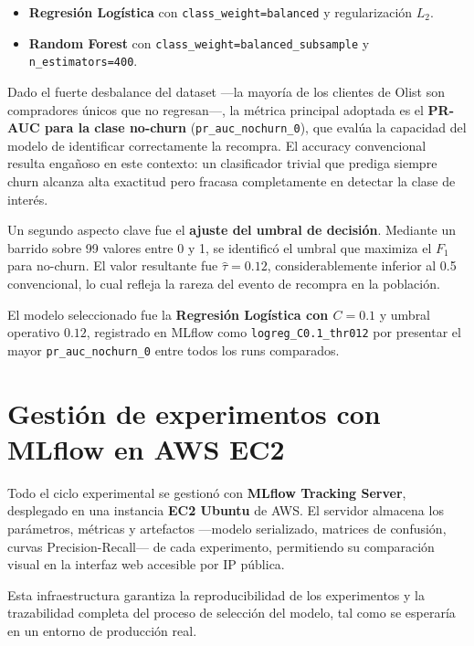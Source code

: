 \documentclass[11pt]{article}
\begin{document}
\begin{itemize}[leftmargin=1.5em]
  \item \textbf{Regresión Logística} con \texttt{class\_weight=balanced} y regularización $L_2$.
  \item \textbf{Random Forest} con \texttt{class\_weight=balanced\_subsample} y
        \texttt{n\_estimators=400}.
\end{itemize}

Dado el fuerte desbalance del dataset —la mayoría de los clientes de Olist son compradores
únicos que no regresan—, la métrica principal adoptada es el
\textbf{PR-AUC para la clase no-churn} (\texttt{pr\_auc\_nochurn\_0}), que evalúa la
capacidad del modelo de identificar correctamente la recompra. El accuracy convencional
resulta engañoso en este contexto: un clasificador trivial que prediga siempre churn alcanza
alta exactitud pero fracasa completamente en detectar la clase de interés.

Un segundo aspecto clave fue el \textbf{ajuste del umbral de decisión}. Mediante un barrido
sobre 99 valores entre 0 y 1, se identificó el umbral que maximiza el $F_1$ para no-churn.
El valor resultante fue $\hat\tau = 0.12$, considerablemente inferior al 0.5 convencional,
lo cual refleja la rareza del evento de recompra en la población.

El modelo seleccionado fue la \textbf{Regresión Logística con $C=0.1$} y umbral operativo
$0.12$, registrado en MLflow como \texttt{logreg\_C0.1\_thr012} por presentar el mayor
\texttt{pr\_auc\_nochurn\_0} entre todos los runs comparados.

\section{Gestión de experimentos con MLflow en AWS EC2}

Todo el ciclo experimental se gestionó con \textbf{MLflow Tracking Server}, desplegado en
una instancia \textbf{EC2 Ubuntu} de AWS. El servidor almacena los parámetros, métricas y
artefactos —modelo serializado, matrices de confusión, curvas Precision-Recall— de cada
experimento, permitiendo su comparación visual en la interfaz web accesible por IP pública.

Esta infraestructura garantiza la reproducibilidad de los experimentos y la trazabilidad
completa del proceso de selección del modelo, tal como se esperaría en un entorno de
producción real.
\end{document}
